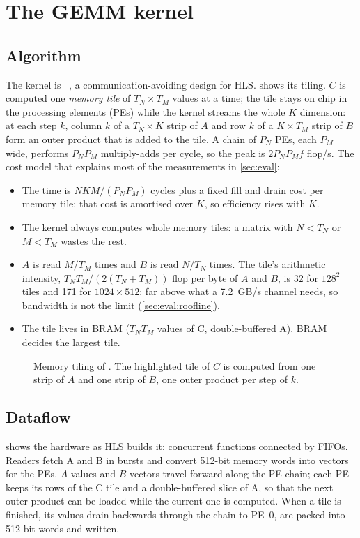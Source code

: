 \section{The GEMM kernel}
\label{sec:kernel}

\subsection{Algorithm}
The kernel is ~\cite{gemmhls}, a communication-avoiding design for HLS.  shows its
tiling. \(C\) is computed one \emph{memory tile} of \(T_N\times T_M\) values at a time; the tile stays on chip in the
processing elements (PEs) while the kernel streams the whole \(K\) dimension: at each step \(k\), column \(k\) of a
\(T_N\times K\) strip of \(A\) and row \(k\) of a \(K\times T_M\) strip of \(B\) form an outer product that is added to
the tile. A chain of \(P_N\) PEs, each \(P_M\) wide, performs \(P_N P_M\) multiply-adds per cycle, so the peak is
\(2 P_N P_M f\) flop/s. The cost model that explains most of the measurements in \cref{sec:eval}:
\begin{itemize}
  \item The time is \(NKM/(P_N P_M)\) cycles plus a fixed fill and drain cost per memory tile; that cost is amortised
        over \(K\), so efficiency rises with \(K\).
  \item The kernel always computes whole memory tiles: a matrix with \(N < T_N\) or \(M < T_M\) wastes the rest.
  \item \(A\) is read \(M/T_M\) times and \(B\) is read \(N/T_N\) times. The tile's arithmetic intensity,
        \(T_N T_M / (2(T_N+T_M))\) flop per byte of \(A\) and \(B\), is 32 for \(128^2\) tiles and 171 for
        \(1024\times512\): far above what a \SI{7.2}{GB/s} channel needs, so bandwidth is not the limit
        (\cref{sec:eval:roofline}).
  \item The tile lives in BRAM (\(T_N T_M\) values of C, double-buffered A). BRAM decides the largest tile.
\end{itemize}

\begin{figure}[t]
  \centering
  \resizebox{\linewidth}{!}{}
  \caption{Memory tiling of . The highlighted tile of \(C\) is computed from one strip of \(A\) and
    one strip of \(B\), one outer product per step of \(k\).}
  \label{fig:tiling}
\end{figure}

\subsection{Dataflow}
 shows the hardware as HLS builds it: concurrent functions connected by FIFOs. Readers fetch A and B
in bursts and convert 512-bit memory words into vectors for the PEs. \(A\) values and \(B\) vectors travel forward
along the PE chain; each PE keeps its rows of the C tile and a double-buffered slice of A, so that the next outer
product can be loaded while the current one is computed. When a tile is finished, its values drain backwards through
the chain to PE~0, are packed into 512-bit words and written.

